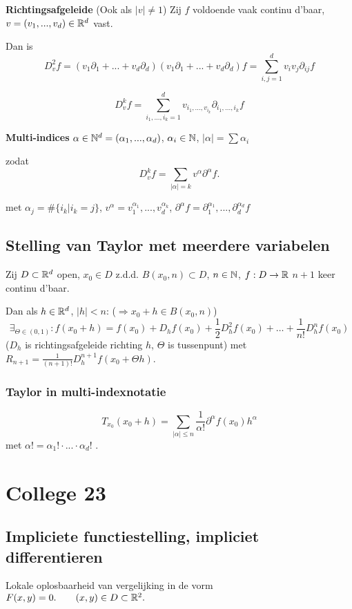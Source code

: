 \documentclass{2wa40summary}
\begin{document}
			 \textbf{Richtingsafgeleide} (Ook als $|v|\neq 1$)
			Zij $f$ voldoende vaak continu d'baar, $v=(v_1,...,v_d) \in \mathbb{R}^d$ vast.
			
			Dan is \[ D_v^2 f = (v_1 \partial_1 + ... + v_d \partial_d)(v_1 \partial_1 + ... + v_d \partial_d)f = \sum_{i,j=1}^{d} v_i v_j \partial_{ij}f \]
			
			\[ D_v^k f = \sum_{i_1,...,i_k=1}^{d} v_{{i_1},...,v_{i_k}} \partial_{i_1,...,i_k} f \]
			
			\nota \textbf{Multi-indices} $ \alpha \in \mathbb{N}^d = (\alpha_1 ,..., \alpha_d) $, $\alpha_i \in \mathbb{N}$, $ |\alpha| = \sum \alpha_i $
			
			zodat \[ D_v^k f = \sum_{|\alpha|=k} v^\alpha \partial^\alpha f. \]
			
			met $ \alpha_j = \#\{i_k | i_k = j\} $, $ v^\alpha = v_1^{\alpha_1} ,..., v_d^{\alpha_k} $, $ \partial^\alpha f = \partial_1^{\alpha_1},...,\partial_d^{\alpha_d} f $
			
		\subsection{Stelling van Taylor met meerdere variabelen}
			\theorem Zij  $D \subset \mathbb{R}^d$ open, $x_0 \in D$ z.d.d. $B(x_0,n) \subset D$, $n\in \mathbb{N}$, $f:D\to \mathbb{R}$ $n+1$ keer continu d'baar.
			
			Dan als $h \in \mathbb{R}^d$, $ |h|<n $: ($\Rightarrow x_0+h \in B(x_0,n)$)
			\[ \exists_{\Theta \in (0,1)}:f(x_0+h) = f(x_0) + D_h f(x_0) + \frac{1}{2} D_h^2 f(x_0) + \dots + \frac{1}{n!} D_h^n f(x_0) \]
			($D_h$ is richtingsafgeleide richting $h$, $\Theta$ is tussenpunt)
			met $R_{n+1} = \frac{1}{(n+1)!}D_h^{n+1} f(x_0 + \Theta h)$.
		
			\subsubsection{Taylor in multi-indexnotatie}
				\[ T_{x_0} (x_0 + h) = \sum_{|\alpha|\le n} \frac{1}{\alpha !} \partial^\alpha f(x_0)h^\alpha \] met $ \alpha ! = \alpha_1 ! \cdot ... \cdot \alpha_d !$ .
		
	\newpage
	\section{College 23}
		\subsection{Impliciete functiestelling, impliciet differentieren}
			Lokale oplosbaarheid van vergelijking in de vorm $ F(x,y)=0. \qquad (x,y) \in D \subset \mathbb{R}^2. $
			
\end{document}
